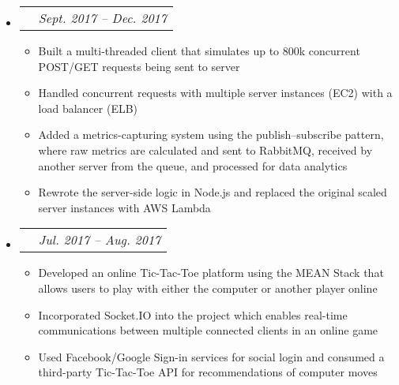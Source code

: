 \documentclass{article}
\makeatletter
\newcommand{\resitem}[1]{
    \item #1
    \vspace{-2pt}
}
\newcommand{\ressubheadingproj}[2]{
\begin{tabular*}{6.80in}{l@{\extracolsep{\fill}}r}
    \textbf{#1} & \textit{#2} \\
\end{tabular*}\vspace{-6pt}}
\makeatother
\begin{document}
    \begin{itemize}
        \item\ressubheadingproj
        {\href
        {https://github.com/jeremylinlin/cs6650-scalable-distributed-systems}
        {Distributed Ski Data Processing Engine}
        }
        {Sept. 2017 -- Dec. 2017}
        {\footnotesize
        \begin{itemize}
            \resitem
            {Built a multi-threaded client that simulates up to 800k concurrent POST/GET
            requests being sent to server}
            \resitem
            {Handled concurrent requests with multiple server instances (EC2)
            with a load balancer (ELB)}
            \resitem
            {Added a metrics-capturing system using the publish--subscribe pattern, where
            raw metrics are calculated and sent to RabbitMQ, received by another server
            from the queue, and processed for data analytics}
            \resitem
            {Rewrote the server-side logic in Node.js and replaced the original scaled server
            instances with AWS Lambda}

        \end{itemize}
        }
    \end{itemize}

    \begin{itemize}
        \item\ressubheadingproj
        {\href
        {https://github.com/jeremylinlin/tic-tac-toe-mean}
        {Multiplayer Tic-Tac-Toe Game Platform}
        }
        {Jul. 2017 -- Aug. 2017}
        {\footnotesize
        \begin{itemize}
            \resitem
            {Developed an online Tic-Tac-Toe platform using the MEAN Stack that allows
            users to play with either the computer or another player online}
            \resitem
            {Incorporated Socket.IO into the project which enables real-time
            communications between multiple connected clients in an online game}
            \resitem
            {Used Facebook/Google Sign-in services for social login and consumed a
            third-party Tic-Tac-Toe API for recommendations of computer moves}
        \end{itemize}
        }
    \end{itemize}
\end{document}
